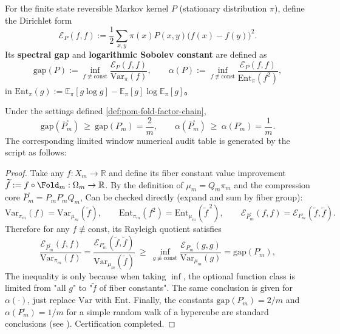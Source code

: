 \begin{definition}\label{def:pom-gap-lsi}
For the finite state reversible Markov kernel \(P\) (stationary distribution \(\pi\)), define the Dirichlet form
\[
\mathcal E_P(f,f):=\frac12\sum_{x,y}\pi(x)P(x,y)\bigl(f(x)-f(y)\bigr)^2.
\]
Its \textbf{spectral gap} and \textbf{logarithmic Sobolev constant} are defined as
\[
\mathrm{gap}(P):=\inf_{f\not\equiv \mathrm{const}}\frac{\mathcal E_P(f,f)}{\mathrm{Var}_{\pi}(f)},
\qquad
\alpha(P):=\inf_{f\not\equiv \mathrm{const}}\frac{\mathcal E_P(f,f)}{\mathrm{Ent}_{\pi}(f^2)},
\]
in
\(
\mathrm{Ent}_{\pi}(g):=\mathbb E_{\pi}[g\log g]-\mathbb E_{\pi}[g]\log\mathbb E_{\pi}[g]
\)。
\end{definition}

\begin{theorem}\label{thm:pom-fold-factor-chain-gap-lsi}
Under the settings defined \ref{def:pom-fold-factor-chain},
\[
\mathrm{gap}(\overline P^{\square}_m)\ \ge\ \mathrm{gap}(P^{\square}_m)=\frac{2}{m},
\qquad
\alpha(\overline P^{\square}_m)\ \ge\ \alpha(P^{\square}_m)=\frac{1}{m}.
\]
The corresponding limited window numerical audit table is generated by the script as follows:

\end{theorem}
\begin{proof}
Take any \(f:X_m\to\mathbb R\) and define its fiber constant value improvement \(\widetilde f:=f\circ \Fold_m:\Omega_m\to\mathbb R\).
By the definition of \(\mu_m=Q_m\pi_m\) and the compression core \(\overline P^{\square}_m=P_mP^{\square}_mQ_m\),
Can be checked directly (expand and sum by fiber group):
\[
\mathrm{Var}_{\pi_m}(f)=\mathrm{Var}_{\mu_m}(\widetilde f),\qquad
\mathrm{Ent}_{\pi_m}(f^2)=\mathrm{Ent}_{\mu_m}(\widetilde f^{\,2}),
\qquad
\mathcal E_{\overline P^{\square}_m}(f,f)=\mathcal E_{P^{\square}_m}(\widetilde f,\widetilde f).
\]
Therefore for any \(f\not\equiv \mathrm{const}\), its Rayleigh quotient satisfies
\[
\frac{\mathcal E_{\overline P^{\square}_m}(f,f)}{\mathrm{Var}_{\pi_m}(f)}
=
\frac{\mathcal E_{P^{\square}_m}(\widetilde f,\widetilde f)}{\mathrm{Var}_{\mu_m}(\widetilde f)}
\ \ge\
\inf_{g\not\equiv \mathrm{const}}\frac{\mathcal E_{P^{\square}_m}(g,g)}{\mathrm{Var}_{\mu_m}(g)}
=\mathrm{gap}(P^{\square}_m),
\]
The inequality is only because when taking \(\inf\), the optional function class is limited from "all \(g\)" to "\(\widetilde f\) of fiber constants".
The same conclusion is given for \(\alpha(\cdot)\), just replace \(\mathrm{Var}\) with \(\mathrm{Ent}\).
Finally, the constants \(\mathrm{gap}(P^{\square}_m)=2/m\) and \(\alpha(P^{\square}_m)=1/m\) for a simple random walk of a hypercube are standard conclusions (see \cite{LevinPeresWilmer2009MarkovMixing}). Certification completed.
\end{proof}


